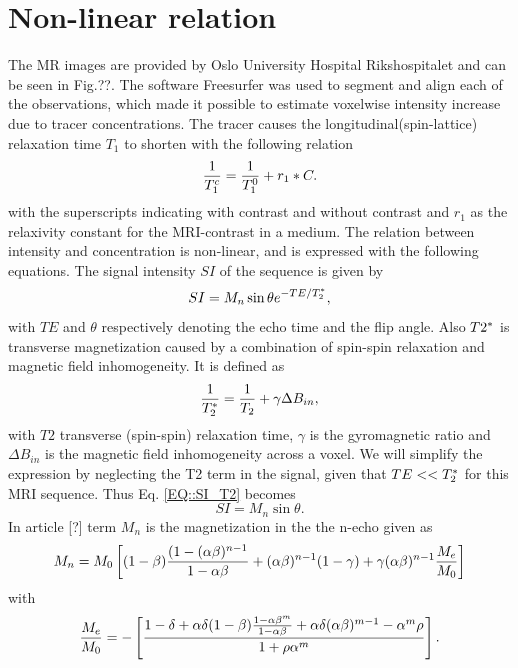 \documentclass[11pt,a4paper]{article}
\begin{document}
\section*{Non-linear relation}
The MR images are provided by Oslo University Hospital Rikshospitalet and can be seen in Fig.??. The software Freesurfer was used to segment and align each of the observations, which made it possible to estimate voxelwise intensity increase due to tracer concentrations. The tracer causes the longitudinal(spin-lattice) relaxation time $T_{1}$ to shorten with the following relation
\begin{equation}
\frac{1}{T_{1}\sp{c}} = \frac{1}{T_{1}\sp{0}} + r_{1}*C .
\label{EQ::contrast}
\end{equation}
with the superscripts indicating with contrast and without contrast and $r_1$ as the relaxivity constant for the MRI-contrast in a medium. The relation between intensity and concentration is non-linear, and is expressed with the following equations. The signal intensity $SI$ of the sequence is given by
\begin{equation}
SI = M_{n} \sin \theta e\sp{ - TE/T_2\sp{*} },
\label{EQ::SI_T2}
\end{equation}
with  $TE$ and $\theta$ respectively denoting the echo time and the flip angle. Also $T2\sp{*}$ is transverse magnetization caused by a combination of spin-spin relaxation and magnetic field inhomogeneity. It is defined as 
\begin{equation}
\frac{1}{T_2\sp{*}} = \frac{1}{T_2} + \gamma \Delta B_{in} ,
\end{equation}
with $T2$ transverse (spin-spin) relaxation time, $\gamma$ is the gyromagnetic ratio and $\Delta B_{in}$ is the magnetic field inhomogeneity
across a voxel. %
We will simplify the expression by neglecting the T2 term in the signal,
given that $TE <<T_2\sp{*}$ for this MRI sequence. Thus Eq. \ref{EQ::SI_T2} becomes 
\begin{equation}
SI = M_{n} \sin \theta.
\label{EQ::SI}
\end{equation}
In article [?] term $M_n$ is the magnetization in the the n-echo given as 
\begin{equation}
M_{n} = M_{0}  \left[ (1-\beta)\frac{(1-(\alpha \beta)\sp{n-1} }{1-\alpha\beta} + (\alpha \beta)\sp{n-1}(1-\gamma) + \gamma ( \alpha \beta)\sp{n-1} \frac{M_{e}}{M_{0}}  \right]   
\end{equation}
with 
\begin{equation}
\frac{M_{e}}{M_{0}} = - \left[ \frac{ 1 -\delta + \alpha \delta (1-\beta ) \frac{1-\alpha\beta\sp{m}}{1-\alpha \beta} + \alpha\delta(\alpha\beta)\sp{m-1} - \alpha\sp{m}\rho}{1 +\rho \alpha\sp{m} } \right].
\end{equation}
\end{document}
